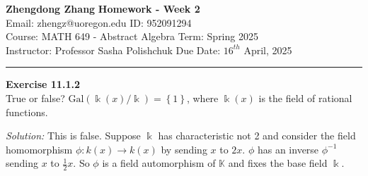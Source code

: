 \documentclass[a4paper, 12pt]{article}
\newenvironment{problem}[2][Exercise]
    { \begin{mdframed}[backgroundcolor=gray!20] \textbf{#1 #2} \\}
    {  \end{mdframed}}
\newenvironment{solution}
    {\textit{Solution:}}
    {}
\newcommand{\Gal}{\text{Gal}}
\begin{document}
\noindent
\large\textbf{Zhengdong Zhang} \hfill \textbf{Homework - Week 2}   \\
Email: zhengz@uoregon.edu \hfill ID: 952091294 \\
\normalsize Course: MATH 649 - Abstract Algebra  \hfill Term: Spring 2025\\
Instructor: Professor Sasha Polishchuk \hfill Due Date: $16^{th}$ April, 2025 \\
\noindent\rule{7in}{2.8pt}
\begin{problem}{11.1.2}
True or false? \(\Gal(\Bbbk(x)/\Bbbk)=\left\{ 1 \right\}\), where \(\Bbbk(x)\) is the field of rational functions.
\end{problem}
\begin{solution}
This is false. Suppose \(\Bbbk\) has characteristic not 2 and consider the field homomorphism \(\phi:k(x)\rightarrow k(x)\) by sending \(x\) to \(2x\). \(\phi\) has an inverse \(\phi^{-1}\) sending \(x\) to \(\frac{1}{2}x\). So \(\phi\) is a field automorphism of \(\mathbb{K}\) and
fixes the base field \(\Bbbk\).
\end{solution}
\end{document}
